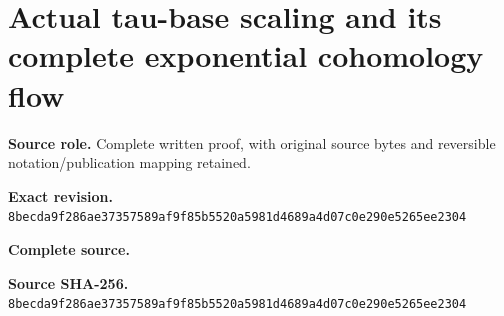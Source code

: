 \begingroup
\sloppy
\small
\section{Actual tau-base scaling and its complete exponential cohomology flow}
\noindent\textbf{Source role.} Complete written proof, with original source bytes and reversible notation/publication mapping retained.\par
\noindent\textbf{Exact revision.} \nolinkurl{8becda9f286ae37357589af9f85b5520a5981d4689a4d07c0e290e5265ee2304}\par
\noindent\textbf{Complete source.} \par
\noindent\textbf{Source SHA-256.} \nolinkurl{8becda9f286ae37357589af9f85b5520a5981d4689a4d07c0e290e5265ee2304}\par\medskip

\endgroup
